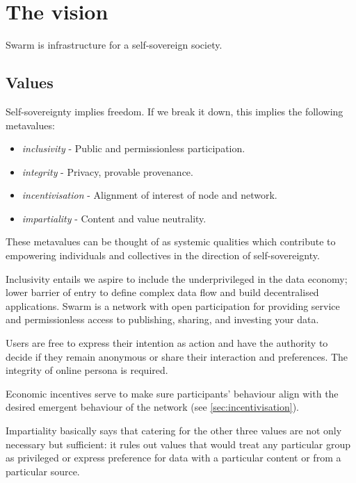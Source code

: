 \section{The vision  \statusorange}\label{sec:vision}


\begin{displayquote}
Swarm is infrastructure for a self-sovereign society. 
\end{displayquote}


\subsection{Values \statusorange}\label{sec:values}

Self-sovereignty implies freedom. If we break it down, this implies the following metavalues: 

\begin{itemize}
\item \emph{inclusivity} - Public and permissionless participation.  
\item \emph{integrity} - Privacy, provable provenance. 
\item \emph{incentivisation} - Alignment of interest of node and network.
\item \emph{impartiality} -  Content and value neutrality.  
\end{itemize}

These metavalues can be thought of as systemic qualities which contribute to empowering individuals and collectives in the direction of self-sovereignty.

Inclusivity entails we aspire to include the underprivileged in the data economy; lower barrier of entry to define complex data flow and build decentralised applications. Swarm is a network with open participation for providing service and permissionless access to publishing, sharing, and investing your data.

Users are free to express their intention as action and have the authority to decide if they remain anonymous or share their interaction and preferences. The integrity of online persona is required. 

Economic incentives serve to make sure participants' behaviour align with the desired emergent behaviour of the network (see \ref{sec:incentivisation}). 

Impartiality basically says that catering for the other three values are not only necessary but sufficient: it rules out values that would treat any particular group as privileged or express preference for data with a particular content or from a particular source.

